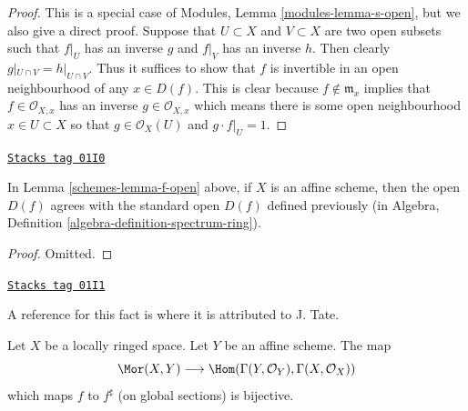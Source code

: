 \begin{proof}
This is a special case of Modules, Lemma \ref{modules-lemma-s-open}, but
we also give a direct proof.
Suppose that $U \subset X$ and $V \subset X$ are
two open subsets such that $f|_U$ has an inverse
$g$ and $f|_V$ has an inverse $h$. Then clearly
$g|_{U\cap V} = h|_{U\cap V}$. Thus it suffices
to show that $f$ is invertible in an open neighbourhood
of any $x \in D(f)$. This is clear because
$f \not \in \mathfrak m_x$ implies that $f \in \mathcal{O}_{X, x}$
has an inverse $g \in \mathcal{O}_{X, x}$ which means there
is some open neighbourhood $x \in U \subset X$ so
that $g \in \mathcal{O}_X(U)$ and $g\cdot f|_U = 1$.
\end{proof}

\begin{lemma}
\label{schemes-lemma-f-open-affine}
\href{https://stacks.math.columbia.edu/tag/01I0}{\texttt{Stacks tag 01I0}}

In Lemma \ref{schemes-lemma-f-open} above, if $X$ is an affine scheme,
then the open $D(f)$ agrees with the standard open $D(f)$
defined previously (in
Algebra, Definition \ref{algebra-definition-spectrum-ring}).
\end{lemma}

\begin{proof}
Omitted.
\end{proof}

\begin{lemma}
\label{schemes-lemma-morphism-into-affine}
\href{https://stacks.math.columbia.edu/tag/01I1}{\texttt{Stacks tag 01I1}}

\begin{reference}
A reference for this fact is \cite[II, Err 1, Prop. 1.8.1]{EGA}
where it is attributed to J. Tate.
\end{reference}
Let $X$ be a locally ringed space.
Let $Y$ be an affine scheme.
The map
$$
\Mor(X, Y)
\longrightarrow
\Hom(\Gamma(Y, \mathcal{O}_Y), \Gamma(X, \mathcal{O}_X))
$$
which maps $f$ to $f^\sharp$ (on global sections) is bijective.
\end{lemma}

